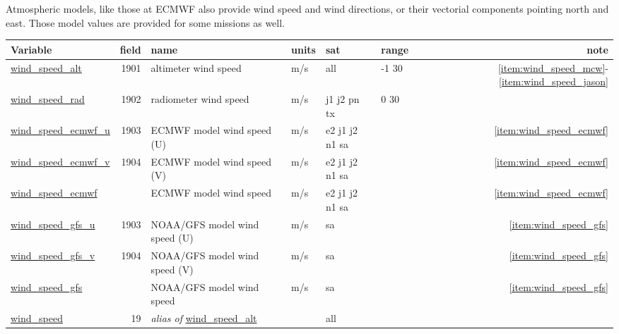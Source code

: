 \documentclass[a4paper,11pt,openany,natbib]{thesis}
\makeatletter
\newcommand\var[1]{\url{#1}\index{variables!#1@\protect\url{#1}}}
\newcommand\alias[1]{\emph{alias of} \var{#1}}
\newenvironment{vartable}{
\begin{table}[ht]
\small
\begin{tabular}{lrllllr}
\hline
Variable & field & name & units & sat & range & note \\
\hline
}{
\hline
\end{tabular}
\end{table}
}
\makeatother
\begin{document}
Atmospheric models, like those at ECMWF also provide wind speed and wind directions, or their vectorial components pointing north and east. Those model values are provided for some missions as well.

\begin{vartable}
\var{wind_speed_alt} & 1901 & altimeter wind speed & m/s & all & -1 30 & \ref{item:wind_speed_mcw}-\ref{item:wind_speed_jason} \\
\var{wind_speed_rad} & 1902 & radiometer wind speed & m/s & j1 j2 pn tx & 0 30 & \\
\var{wind_speed_ecmwf_u} & 1903 & ECMWF model wind speed (U) & m/s & e2 j1 j2 n1 sa & & \ref{item:wind_speed_ecmwf} \\ 
\var{wind_speed_ecmwf_v} & 1904 & ECMWF model wind speed (V) & m/s & e2 j1 j2 n1 sa & & \ref{item:wind_speed_ecmwf} \\ 
\var{wind_speed_ecmwf} & & ECMWF model wind speed & m/s & e2 j1 j2 n1 sa & & \ref{item:wind_speed_ecmwf} \\ 
\var{wind_speed_gfs_u} & 1903 & NOAA/GFS model wind speed (U) & m/s & sa & & \ref{item:wind_speed_gfs} \\ 
\var{wind_speed_gfs_v} & 1904 & NOAA/GFS model wind speed (V) & m/s & sa & & \ref{item:wind_speed_gfs} \\ 
\var{wind_speed_gfs} & & NOAA/GFS model wind speed & m/s & sa & & \ref{item:wind_speed_gfs} \\ 
\hline
\var{wind_speed} & 19 & \alias{wind_speed_alt} && all && \\
\end{vartable}
\end{document}
